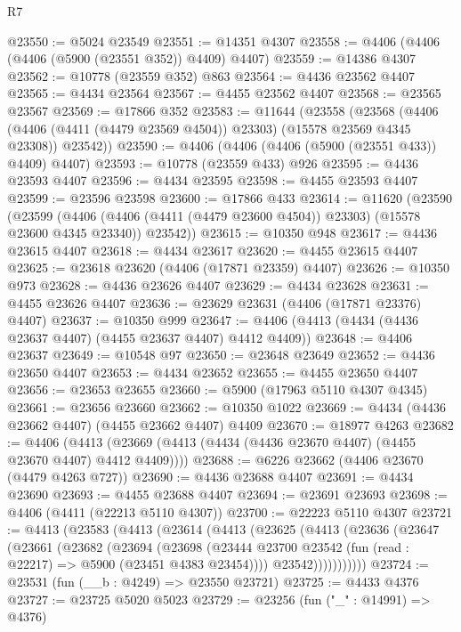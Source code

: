 \begin{lexlean}{R7}
\begin{coremodule}
@23550 := @5024 @23549
@23551 := @14351 @4307
@23558 := @4406 (@4406 (@4406 (@5900 (@23551 @352)) @4409) @4407)
@23559 := @14386 @4307
@23562 := @10778 (@23559 @352) @863
@23564 := @4436 @23562 @4407
@23565 := @4434 @23564
@23567 := @4455 @23562 @4407
@23568 := @23565 @23567
@23569 := @17866 @352
@23583 := @11644
    (@23558
      (@23568
        (@4406 (@4406 (@4411 (@4479 @23569 @4504)) @23303) (@15578 @23569 @4345 @23308))
        @23542))
@23590 := @4406 (@4406 (@4406 (@5900 (@23551 @433)) @4409) @4407)
@23593 := @10778 (@23559 @433) @926
@23595 := @4436 @23593 @4407
@23596 := @4434 @23595
@23598 := @4455 @23593 @4407
@23599 := @23596 @23598
@23600 := @17866 @433
@23614 := @11620
    (@23590
      (@23599
        (@4406 (@4406 (@4411 (@4479 @23600 @4504)) @23303) (@15578 @23600 @4345 @23340))
        @23542))
@23615 := @10350 @948
@23617 := @4436 @23615 @4407
@23618 := @4434 @23617
@23620 := @4455 @23615 @4407
@23625 := @23618 @23620 (@4406 (@17871 @23359) @4407)
@23626 := @10350 @973
@23628 := @4436 @23626 @4407
@23629 := @4434 @23628
@23631 := @4455 @23626 @4407
@23636 := @23629 @23631 (@4406 (@17871 @23376) @4407)
@23637 := @10350 @999
@23647 := @4406 (@4413 (@4434 (@4436 @23637 @4407) (@4455 @23637 @4407) @4412 @4409))
@23648 := @4406 @23637
@23649 := @10548 @97
@23650 := @23648 @23649
@23652 := @4436 @23650 @4407
@23653 := @4434 @23652
@23655 := @4455 @23650 @4407
@23656 := @23653 @23655
@23660 := @5900 (@17963 @5110 @4307 @4345)
@23661 := @23656 @23660
@23662 := @10350 @1022
@23669 := @4434 (@4436 @23662 @4407) (@4455 @23662 @4407) @4409
@23670 := @18977 @4263
@23682 := @4406
    (@4413 (@23669 (@4413 (@4434 (@4436 @23670 @4407) (@4455 @23670 @4407) @4412 @4409))))
@23688 := @6226 @23662 (@4406 @23670 (@4479 @4263 @727))
@23690 := @4436 @23688 @4407
@23691 := @4434 @23690
@23693 := @4455 @23688 @4407
@23694 := @23691 @23693
@23698 := @4406 (@4411 (@22213 @5110 @4307))
@23700 := @22223 @5110 @4307
@23721 := @4413
    (@23583
      (@4413
        (@23614
          (@4413
            (@23625
              (@4413
                (@23636
                  (@23647
                    (@23661
                      (@23682
                        (@23694
                          (@23698
                            (@23444
                              @23700
                              @23542
                              (fun (read : @22217) => @5900 (@23451 @4383 @23454))))
                          @23542)))))))))))
@23724 := @23531 (fun (__b : @4249) => @23550 @23721)
@23725 := @4433 @4376
@23727 := @23725 @5020 @5023
@23729 := @23256 (fun ("_" : @14991) => @4376)

\end{coremodule}
\end{lexlean}
